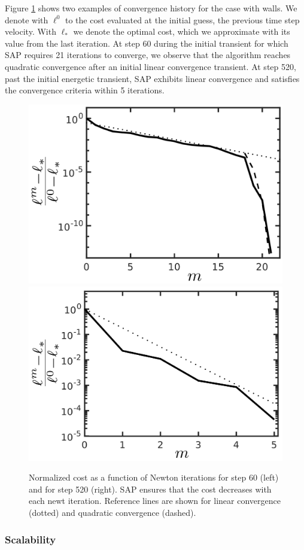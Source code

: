 Figure \ref{fig:clutter_line_search} shows two examples of convergence history
for the case with walls. We denote with $\ell^0$ to the cost evaluated at the
initial guess, the previous time step velocity. With $\ell_*$ we denote the
optimal cost, which we approximate with its value from the last iteration. At
step 60 during the initial transient for which SAP requires 21 iterations to
converge, we observe that the algorithm reaches quadratic convergence after an
initial linear convergence transient. At step 520, past the initial energetic
transient, SAP exhibits linear convergence and satisfies the convergence
criteria within 5 iterations.
\begin{figure}[!h]
	\centering
    \includegraphics[height=0.34\columnwidth]{figures/clutter/normalized_cost_step60_21its_wwalls_latex_labels.png}
	\includegraphics[height=0.34\columnwidth]{figures/clutter/normalized_cost_step520_5its_wwalls_latex_labels.png}    
	\caption{\label{fig:clutter_line_search} 
	Normalized cost as a function of Newton iterations for step 60 (left) and for step 520 (right). SAP ensures that the cost decreases with each newt iteration. Reference lines are shown for linear convergence (dotted) and quadratic convergence (dashed).}
\end{figure}

\subsubsection{Scalability}

